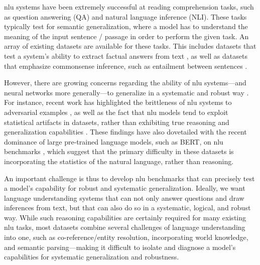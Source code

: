 \documentclass[letterpaper, 12pt]{report}
\begin{document}
\gls{nlu} systems have been extremely successful at reading comprehension tasks, such as question answering (QA) and natural language inference (NLI).
These tasks typically test for semantic generalization, where a model has to understand the meaning of the input sentence / passage in order to perform the given task.
An array of existing datasets are available for these tasks. This includes datasets that test a system's ability to extract factual answers from text \citep{Rajpurkar2016-yc,Nguyen2016-ec,Trischler2016-fc,Mostafazadeh2016-hu,Su2016-so}, as well as datasets that emphasize commonsense inference, such as entailment between sentences \citep{bowman2015large,williams2018broad}.

However, there are growing concerns regarding the ability of \acrshort{nlu} systems---and neural networks more generally---to generalize in a systematic and robust way \citep{bahdanau2018systematic,lake2017generalization,Johnson2016-mw}.
For instance, recent work has highlighted the brittleness of \acrshort{nlu} systems to adversarial examples \citep{jia2017adversarial}, as well as the fact that \acrshort{nlu} models tend to exploit statistical artifacts in datasets, rather than exhibiting true reasoning and generalization capabilities \citep{gururangan2018annotation,kaushik2018much}.
These findings have also dovetailed with the recent dominance of large pre-trained language models, such as BERT, on \acrshort{nlu} benchmarks \citep{devlin2018bert,peters2018deep}, which suggest that the primary difficulty in these datasets is incorporating the statistics of the natural language, rather than reasoning.

An important challenge is thus to develop \acrshort{nlu} benchmarks that can precisely test a model's capability for robust and systematic generalization.
Ideally, we want language understanding systems that can not only answer questions and draw inferences from text, but that can also do so in a systematic, logical, and robust way.
While such reasoning capabilities are certainly required for many existing \acrshort{nlu} tasks, most datasets combine several challenges of language understanding into one, such as co-reference/entity resolution, incorporating world knowledge, and semantic parsing---making it difficult to isolate and diagnose a model's capabilities for systematic generalization and robustness.
\end{document}
